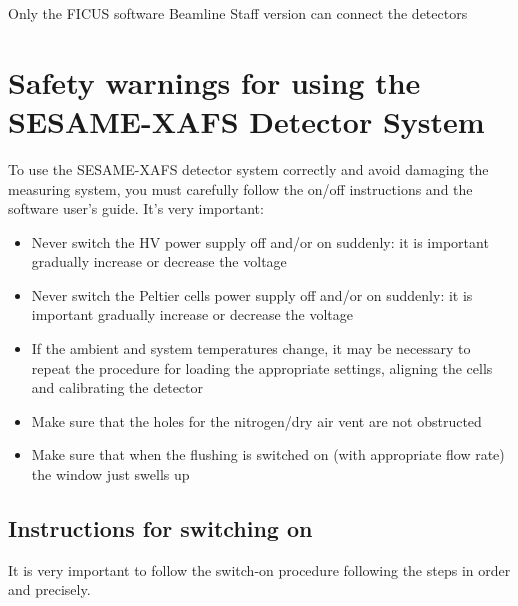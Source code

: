 \documentclass[a4paper,12pt,oneside,pdflatex,italian,final,twocolumn]{article}
\begin{document}
Only the FICUS software Beamline Staff version can connect the detectors










































\clearpage

\section{Safety warnings for using the SESAME-XAFS Detector System} \label{sicurezza}
To use the SESAME-XAFS detector system correctly and avoid damaging the measuring system, you must carefully follow the on/off instructions and the software user's guide.
It's very important:
\begin{itemize}
    \item Never switch the HV power supply off and/or on suddenly: it is important gradually increase or decrease the voltage
    \item Never switch the Peltier cells power supply off and/or on suddenly: it is important gradually increase or decrease the voltage
    \item  If the ambient and system temperatures change, it may be necessary to repeat the procedure for loading the appropriate settings, aligning the cells and calibrating the detector
    \item Make sure that the holes for the nitrogen/dry air vent are not obstructed
    \item Make sure that when the flushing is switched on (with appropriate flow rate) the window just swells up
\end{itemize}

    \subsection{Instructions for switching on} \label{accensione}
  It is very important to follow the switch-on procedure following the steps in order and precisely.
    
\end{document}
